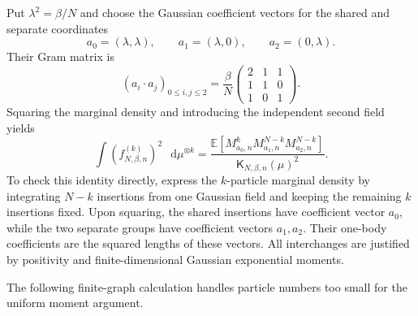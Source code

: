 \documentclass[11pt,reqno]{amsart}
\numberwithin{equation}{section}
\theoremstyle{plain}
\theoremstyle{definition}
\newcommand{\dd}{\mathop{}\!\mathrm d}
\newcommand{\E}{\mathbb E}
\newcommand{\be}{\beta}
\newcommand{\K}{\mathsf K}
\begin{document}
Put $\lambda^2=\be/N$ and choose the Gaussian coefficient vectors for the shared and separate coordinates
\begin{equation}
 a_0=(\lambda,\lambda),\qquad a_1=(\lambda,0),\qquad a_2=(0,\lambda).
 \label{eq:local-replica-charges}
\end{equation}
Their Gram matrix is
\begin{equation}
 (a_i\cdot a_j)_{0\leq i,j\leq2}
 =\frac{\be}{N}
 \begin{pmatrix}2&1&1\\1&1&0\\1&0&1\end{pmatrix}.
 \label{eq:local-replica-Gram}
\end{equation}
Squaring the marginal density and introducing the independent second field yields
\begin{equation}
 \int (f_{N,\be,n}^{(k)})^2\,\dd\mu^{\otimes k}
 =\frac{\E[M_{a_0,n}^kM_{a_1,n}^{N-k}M_{a_2,n}^{N-k}]}
 {\K_{N,\be,n}(\mu)^2}.
 \label{eq:local-exact-replica}
\end{equation}
To check this identity directly, express the $k$-particle marginal density by integrating $N-k$ insertions from one Gaussian field and keeping the remaining $k$ insertions fixed. Upon squaring, the shared insertions have coefficient vector $a_0$, while the two separate groups have coefficient vectors $a_1,a_2$. Their one-body coefficients are the squared lengths of these vectors. All interchanges are justified by positivity and finite-dimensional Gaussian exponential moments.

The following finite-graph calculation handles particle numbers too small for the uniform moment argument.
\end{document}
